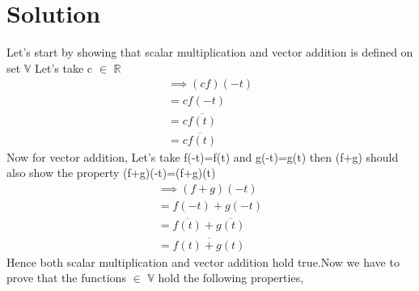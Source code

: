 \documentclass[journal,12pt,twocolumn]{IEEEtran}
\begin{document}
 \section{\textbf{Solution}}
 Let's start by showing that scalar multiplication and vector addition is defined on set $\mathbb{V}$
 Let's take c $\in$ $\mathbb{R}$
 \begin{align}
 \implies(cf)(-t)\\=cf(-t)\\=c\overline{f(t)}\\=\overline{cf(t)}
 \end{align}
 Now for vector addition,
 Let's take f(-t)=f(t) and g(-t)=g(t) then (f+g) should also show the property (f+g)(-t)=(f+g)(t)
 \begin{align}
 \implies(f+g)(-t)\\=f(-t)+g(-t)\\=\overline{f(t)}+\overline{g(t)}\\=\overline{f(t)+g(t)}
 \end{align}
 Hence both scalar multiplication and vector addition hold true.Now we have to prove that the functions $\in$ $\mathbb{V}$ hold the following properties,
\end{document}
